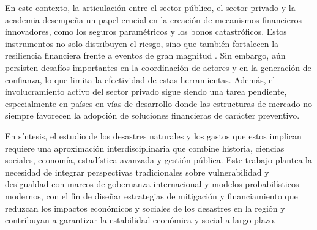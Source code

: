 \documentclass[12pt, a4paper]{article}
\begin{document}
En este contexto, la articulación entre el sector público, el sector privado y la academia desempeña un papel crucial en la creación de mecanismos financieros innovadores, como los seguros paramétricos y los bonos catastróficos. Estos instrumentos no solo distribuyen el riesgo, sino que también fortalecen la resiliencia financiera frente a eventos de gran magnitud \cite{quesada2020}. Sin embargo, aún persisten desafíos importantes en la coordinación de actores y en la generación de confianza, lo que limita la efectividad de estas herramientas. Además, el involucramiento activo del sector privado sigue siendo una tarea pendiente, especialmente en países en vías de desarrollo donde las estructuras de mercado no siempre favorecen la adopción de soluciones financieras de carácter preventivo.

En síntesis, el estudio de los desastres naturales y los gastos que estos implican requiere una aproximación interdisciplinaria que combine historia, ciencias sociales, economía, estadística avanzada y gestión pública. Este trabajo plantea la necesidad de integrar perspectivas tradicionales sobre vulnerabilidad y desigualdad con marcos de gobernanza internacional y modelos probabilísticos modernos, con el fin de diseñar estrategias de mitigación y financiamiento que reduzcan los impactos económicos y sociales de los desastres en la región y contribuyan a garantizar la estabilidad económica y social a largo plazo.




\nocite{*}%

\end{document}
